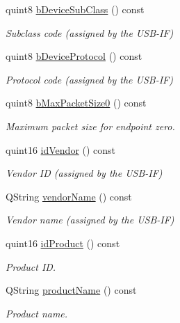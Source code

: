 \begin{DoxyCompactItemize}
quint8 \hyperlink{classmdt_usb_device_descriptor_a50b483ed26f546017bde4ae6f9762268}{b\-Device\-Sub\-Class} () const 
\begin{DoxyCompactList}\small\item\em Subclass code (assigned by the U\-S\-B-\/\-I\-F) \end{DoxyCompactList}\item 
quint8 \hyperlink{classmdt_usb_device_descriptor_aac1207bd8cb91e04f48f6748b1a8ca16}{b\-Device\-Protocol} () const 
\begin{DoxyCompactList}\small\item\em Protocol code (assigned by the U\-S\-B-\/\-I\-F) \end{DoxyCompactList}\item 
quint8 \hyperlink{classmdt_usb_device_descriptor_a08b5ae262e2b966c952ee5e5bcc6fb10}{b\-Max\-Packet\-Size0} () const 
\begin{DoxyCompactList}\small\item\em Maximum packet size for endpoint zero. \end{DoxyCompactList}\item 
quint16 \hyperlink{classmdt_usb_device_descriptor_a8bbfdb3c54af6cccf15cd7e5f29e8a8e}{id\-Vendor} () const 
\begin{DoxyCompactList}\small\item\em Vendor I\-D (assigned by the U\-S\-B-\/\-I\-F) \end{DoxyCompactList}\item 
Q\-String \hyperlink{classmdt_usb_device_descriptor_ac2f746ebd5540b65bf00f82c991f5c3b}{vendor\-Name} () const 
\begin{DoxyCompactList}\small\item\em Vendor name (assigned by the U\-S\-B-\/\-I\-F) \end{DoxyCompactList}\item 
quint16 \hyperlink{classmdt_usb_device_descriptor_a722dad54d42f03470508115f6394b9a1}{id\-Product} () const 
\begin{DoxyCompactList}\small\item\em Product I\-D. \end{DoxyCompactList}\item 
Q\-String \hyperlink{classmdt_usb_device_descriptor_a626afc71d8e72600f12259ac6f5a5866}{product\-Name} () const 
\begin{DoxyCompactList}\small\item\em Product name. \end{DoxyCompactList}\item 

\end{DoxyCompactItemize}
